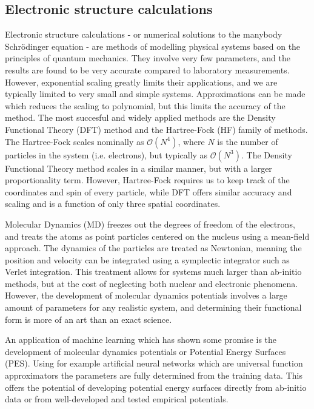 \subsection{Electronic structure calculations}
Electronic structure calculations - or numerical solutions
to the manybody Schr\"{o}dinger equation - are methods of modelling
physical systems based on the principles of quantum mechanics.
They involve very few parameters, and the results are found
to be very accurate compared to laboratory measurements.
However, exponential scaling greatly limits their applications, 
and we are typically limited to very small and simple systems.
Approximations can be made which reduces the scaling
to polynomial, but this limits the accuracy of the method.
The most succesful and widely applied methods
are the Density Functional Theory (DFT) method
and the Hartree-Fock (HF) family of methods.
The Hartree-Fock scales nominally as $\mathcal{O}(N^4)$,
where $N$ is the number of particles in the system
(i.e. electrons), but typically as $\mathcal{O}(N^3)$.
The Density Functional Theory method scales in a similar
manner, but with a larger proportionality term.
However, Hartree-Fock requires us to keep track of
the coordinates and spin of every particle, while
DFT offers similar accuracy and scaling
and is a function of only three spatial coordinates.
\par
Molecular Dynamics (MD) freezes out the degrees of freedom of the
electrons, and treats the atoms as point particles centered on
the nucleus using a mean-field approach.
The dynamics of the particles are treated as Newtonian,
meaning the position and velocity can be integrated using a
symplectic integrator such as Verlet integration.
This treatment allows for systems much larger
than ab-initio methods, but at the cost of neglecting
both nuclear and electronic phenomena.
However, the development of molecular dynamics potentials
involves a large amount of parameters for any realistic system,
and determining their functional form is more of an
art than an exact science.
\par
An application of machine learning which has shown some promise
is the development of molecular dynamics potentials
or Potential Energy Surfaces (PES). Using for example
artificial neural networks which are universal function approximators
the parameters are fully determined from the training data.
This offers the potential of developing potential energy surfaces
directly from ab-initio data or from well-developed and tested
empirical potentials.

